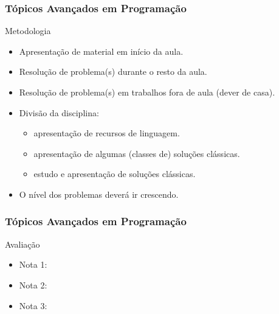 \begin{frame}
 \frametitle{Tópicos Avançados em Programação}
 \begin{block}{Metodologia}
  \begin{itemize}
   \item Apresentação de material em início da aula.
   \item Resolução de problema(s) durante o resto da aula.
   \item Resolução de problema(s) em trabalhos fora de aula (dever de casa).
   \item Divisão da disciplina:
    \begin{itemize}
     \item apresentação de recursos de linguagem.%
     \item apresentação de algumas (classes de) soluções clássicas.%
     \item estudo e apresentação de soluções clássicas.%
    \end{itemize}
   \item O nível dos problemas deverá ir crescendo.
  \end{itemize}
 \end{block}
\end{frame}
\begin{frame}
 \frametitle{Tópicos Avançados em Programação}
 \begin{block}{Avaliação}
  \begin{itemize}
   \item Nota 1:
   \item Nota 2:
   \item Nota 3:
  \end{itemize}
 \end{block}
\end{frame}
